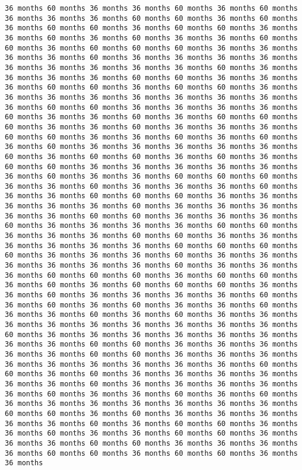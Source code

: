 \documentclass[11pt]{article}
\begin{document}
\begin{Verbatim}[commandchars=\\\{\}, frame=single, framerule=2mm, rulecolor=\color{outerrorbackground}]
36 months 60 months 36 months 36 months 60 months 36 months 60 months 36 months 36 months 36 months 60 months 60 months 36 months 60 months 36 months 60 months 60 months 36 months 60 months 60 months 36 months 36 months 60 months 36 months 60 months 36 months 36 months 60 months 60 months 36 months 60 months 60 months 60 months 36 months 36 months 36 months 36 months 60 months 36 months 36 months 36 months 36 months 36 months 36 months 36 months 36 months 36 months 60 months 36 months 36 months 36 months 36 months 60 months 60 months 36 months 36 months 36 months 60 months 60 months 36 months 60 months 60 months 36 months 36 months 36 months 36 months 36 months 36 months 36 months 36 months 36 months 60 months 60 months 36 months 36 months 36 months 36 months 60 months 36 months 36 months 60 months 36 months 60 months 60 months 60 months 36 months 36 months 60 months 36 months 36 months 36 months 60 months 60 months 36 months 36 months 60 months 36 months 60 months 36 months 60 months 36 months 36 months 36 months 36 months 36 months 60 months 36 months 60 months 60 months 36 months 60 months 36 months 60 months 60 months 36 months 36 months 36 months 36 months 36 months 36 months 60 months 36 months 36 months 60 months 60 months 60 months 36 months 36 months 60 months 36 months 36 months 36 months 60 months 36 months 36 months 60 months 60 months 60 months 36 months 36 months 36 months 36 months 36 months 60 months 36 months 36 months 36 months 36 months 36 months 60 months 60 months 36 months 36 months 36 months 60 months 36 months 36 months 36 months 36 months 60 months 60 months 36 months 36 months 36 months 60 months 60 months 36 months 36 months 36 months 36 months 36 months 36 months 60 months 60 months 60 months 60 months 36 months 36 months 36 months 60 months 36 months 36 months 36 months 36 months 36 months 36 months 60 months 36 months 36 months 36 months 60 months 60 months 60 months 36 months 60 months 60 months 36 months 60 months 36 months 60 months 60 months 60 months 36 months 36 months 60 months 36 months 36 months 36 months 36 months 60 months 36 months 60 months 36 months 60 months 36 months 36 months 60 months 36 months 36 months 60 months 36 months 60 months 36 months 36 months 36 months 36 months 36 months 36 months 36 months 36 months 36 months 60 months 36 months 36 months 36 months 36 months 36 months 36 months 36 months 36 months 60 months 60 months 36 months 36 months 36 months 36 months 36 months 60 months 60 months 36 months 36 months 36 months 36 months 36 months 36 months 36 months 36 months 36 months 60 months 60 months 36 months 60 months 36 months 36 months 36 months 36 months 36 months 36 months 60 months 36 months 36 months 36 months 36 months 36 months 60 months 36 months 36 months 60 months 36 months 60 months 36 months 36 months 36 months 36 months 36 months 36 months 36 months 60 months 60 months 36 months 60 months 36 months 36 months 36 months 36 months 36 months 60 months 36 months 60 months 60 months 36 months 36 months 60 months 36 months 36 months 60 months 60 months 36 months 36 months 36 months 60 months 60 months 36 months 36 months 36 months 36 months 60 months 60 months 36 months 60 months 60 months 36 months 36 months 
\end{Verbatim}
\end{document}
